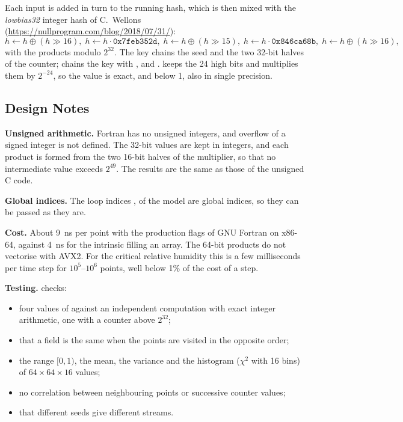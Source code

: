 Each input is added in turn to the running hash, which is then mixed with
the \emph{lowbias32} integer hash of C.~Wellons
(\url{https://nullprogram.com/blog/2018/07/31/}):
\[
  h \leftarrow h \oplus (h \gg 16),\;
  h \leftarrow h \cdot \mathtt{0x7feb352d},\;
  h \leftarrow h \oplus (h \gg 15),\;
  h \leftarrow h \cdot \mathtt{0x846ca68b},\;
  h \leftarrow h \oplus (h \gg 16),
\]
with the products modulo $2^{32}$. The key chains the seed and the two
32-bit halves of the counter;  chains the key with
,  and .  keeps the 24 high
bits and multiplies them by $2^{-24}$, so the value is exact, and below 1,
also in single precision.

\subsection{Design Notes}

\textbf{Unsigned arithmetic.} Fortran has no unsigned integers, and
overflow of a signed integer is not defined. The 32-bit values are kept in
 integers, and each product is formed from the two 16-bit halves
of the multiplier, so that no intermediate value exceeds $2^{49}$. The
results are the same as those of the unsigned C code.

\textbf{Global indices.} The loop indices ,
 of the model are global indices, so they can be passed
as they are.

\textbf{Cost.} About 9~ns per point with the production flags of GNU
Fortran on x86-64, against 4~ns for the intrinsic 
filling an array. The 64-bit products do not vectorise with AVX2. For the
critical relative humidity this is a few milliseconds per time step for
$10^5$--$10^6$ points, well below 1\% of the cost of a step.

\textbf{Testing.}  checks:
\begin{itemize}
  \item four values of  against an independent
    computation with exact integer arithmetic, one with a counter above
    $2^{32}$;
  \item that a field is the same when the points are visited in the
    opposite order;
  \item the range $[0,1)$, the mean, the variance and the histogram
    ($\chi^2$ with 16 bins) of $64 \times 64 \times 16$ values;
  \item no correlation between neighbouring points or successive counter
    values;
  \item that different seeds give different streams.
\end{itemize}


